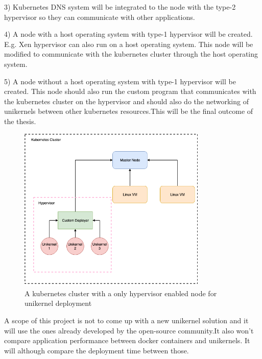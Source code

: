 3) Kubernetes DNS system will be integrated to the node with the type-2 hypervisor so they can communicate with other applications.

4) A node with a host operating system with type-1 hypervisor will be created. E.g. Xen hypervisor can also run on a host operating system. This node will be modified to communicate with the kubernetes cluster through the host operating system. 

5) A node without a host operating system with type-1 hypervisor will be created. This node should also run the custom program that communicates with the kubernetes cluster on the hypervisor and should also do the networking of unikernels between other kubernetes resources.This will be the final outcome of the thesis.

\begin{figure}[htpb]
  \centering
  \includegraphics[width=0.8\textwidth]{figures/arch3.png}
  \caption{A kubernetes cluster with a only hypervisor enabled node for unikernel deployment} \label{fig:hypervisor}
\end{figure}


A scope of this project is not to come up with a new unikernel solution and it will use the ones already developed by the open-source community.It also won't compare application performance between docker containers and unikernels. It will although compare the deployment time between those.
\fi